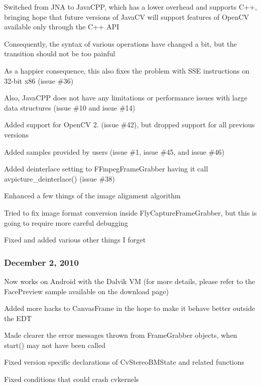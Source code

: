 \begin{DoxyItemize}
\item Switched from J\+N\+A to Java\+C\+P\+P, which has a lower overhead and supports C++, bringing hope that future versions of Java\+C\+V will support features of Open\+C\+V available only through the C++ A\+P\+I
\item Consequently, the syntax of various operations have changed a bit, but the transition should not be too painful
\item As a happier consequence, this also fixes the problem with S\+S\+E instructions on 32-\/bit x86 (issue \#36)
\item Also, Java\+C\+P\+P does not have any limitations or performance issues with large data structures (issue \#10 and issue \#14)
\item Added support for Open\+C\+V 2. (issue \#42), but dropped support for all previous versions
\item Added samples provided by users (issue \#1, issue \#45, and issue \#46)
\item Added deinterlace setting to {\ttfamily F\+Fmpeg\+Frame\+Grabber} having it call {\ttfamily avpicture\+\_\+deinterlace()} (issue \#38)
\item Enhanced a few things of the image alignment algorithm
\item Tried to fix image format conversion inside {\ttfamily Fly\+Capture\+Frame\+Grabber}, but this is going to require more careful debugging
\item Fixed and added various other things I forget
\end{DoxyItemize}

\subsubsection*{December 2, 2010}


\begin{DoxyItemize}
\item Now works on Android with the Dalvik V\+M (for more details, please refer to the Face\+Preview sample available on the download page)
\item Added more hacks to {\ttfamily Canvas\+Frame} in the hope to make it behave better outside the E\+D\+T
\item Made clearer the error messages thrown from {\ttfamily Frame\+Grabber} objects, when {\ttfamily start()} may not have been called
\item Fixed version specific declarations of {\ttfamily Cv\+Stereo\+B\+M\+State} and related functions
\item Fixed conditions that could crash {\ttfamily cvkernels}
\end{DoxyItemize}

